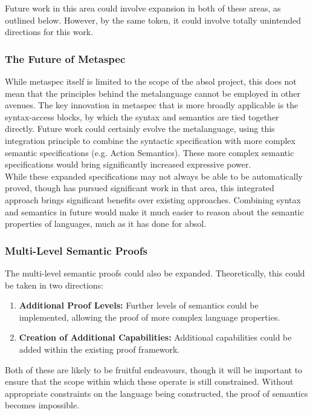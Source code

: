 Future work in this area could involve expansion in both of these areas, as outlined below.
However, by the same token, it could involve totally unintended directions for this work.

\subsubsection{The Future of Metaspec} %
\label{ssub:the_future_of_metaspec}
While \gls{metaspec} itself is limited to the scope of the \gls{absol} project, this does not mean that the principles behind the metalanguage cannot be employed in other avenues. 
The key innovation in metaspec that is more broadly applicable is the syntax-access blocks, by which the syntax and semantics are tied together directly. 
Future work could certainly evolve the metalanguage, using this integration principle to combine the syntactic specification with more complex semantic specifications (e.g. Action Semantics).
These more complex semantic specifications would bring significantly increased expressive power.\\

While these expanded specifications may not always be able to be automatically proved, though \citet{Mosses:2009:CS:1596486.1596489} has pursued significant work in that area, this integrated approach brings significant benefits over existing approaches.
Combining syntax and semantics in future would make it much easier to reason about the semantic properties of languages, much as it has done for \gls{absol}.


\subsubsection{Multi-Level Semantic Proofs} %
\label{ssub:multi_level_semantic_proofs}
The multi-level semantic proofs could also be expanded.
Theoretically, this could be taken in two directions:
\begin{enumerate}
    \item \textbf{Additional Proof Levels:} Further levels of semantics could be implemented, allowing the proof of more complex language properties.
    \item \textbf{Creation of Additional Capabilities:} Additional capabilities could be added within the existing proof framework.
\end{enumerate}

Both of these are likely to be fruitful endeavours, though it will be important to ensure that the scope within which these operate is still constrained.
Without appropriate constraints on the language being constructed, the proof of semantics becomes impossible.\\

